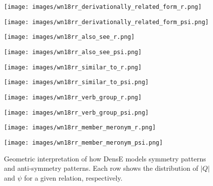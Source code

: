 \documentclass[11pt]{article}
\begin{document}
\begin{figure*}[htbp]
\centering
\begin{minipage}{6cm}
\centering
\texttt{[image: images/wn18rr\_derivationally\_related\_form\_r.png]}
\end{minipage}
\begin{minipage}{6cm}
\centering
\texttt{[image: images/wn18rr\_derivationally\_related\_form\_psi.png]}
\end{minipage}


\begin{minipage}{6cm}
\centering
\texttt{[image: images/wn18rr\_also\_see\_r.png]}
\end{minipage}\begin{minipage}{6cm}
\centering
\texttt{[image: images/wn18rr\_also\_see\_psi.png]}
\end{minipage}


\begin{minipage}{6cm}
\centering
\texttt{[image: images/wn18rr\_similar\_to\_r.png]}
\end{minipage}\begin{minipage}{6cm}
\centering
\texttt{[image: images/wn18rr\_similar\_to\_psi.png]}
\end{minipage}


\begin{minipage}{6cm}
\centering
\texttt{[image: images/wn18rr\_verb\_group\_r.png]}
\end{minipage}\begin{minipage}{6cm}
\centering
\texttt{[image: images/wn18rr\_verb\_group\_psi.png]}
\end{minipage}


\begin{minipage}{6cm}
\centering
\texttt{[image: images/wn18rr\_member\_meronym\_r.png]}
\end{minipage}\begin{minipage}{6cm}
\centering
\texttt{[image: images/wn18rr\_member\_meronym\_psi.png]}
\end{minipage}
\caption{Geometric interpretation of how DensE models symmetry patterns and anti-symmetry patterns. Each row shows the distribution of \(|Q|\) and \(\psi\) for a given relation, respectively.}
\label{symmetric plots}
\end{figure*}
\end{document}
